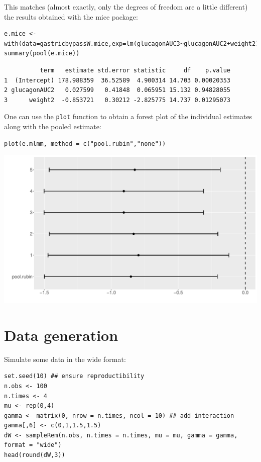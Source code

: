 \documentclass[12pt]{article}
\begin{document}
\clearpage

This matches (almost exactly, only the degrees of freedom are a little
different) the results obtained with the mice package:
\lstset{language=r,label= ,caption= ,captionpos=b,numbers=none}
\begin{lstlisting}
e.mice <- with(data=gastricbypassW.mice,exp=lm(glucagonAUC3~glucagonAUC2+weight2))
summary(pool(e.mice))
\end{lstlisting}

\begin{verbatim}
          term   estimate std.error statistic     df    p.value
1  (Intercept) 178.988359  36.52589  4.900314 14.703 0.00020353
2 glucagonAUC2   0.027599   0.41848  0.065951 15.132 0.94828055
3      weight2  -0.853721   0.30212 -2.825775 14.737 0.01295073
\end{verbatim}


One can use the \texttt{plot} function to obtain a forest plot of the
individual estimates along with the pooled estimate:
\lstset{language=r,label= ,caption= ,captionpos=b,numbers=none}
\begin{lstlisting}
plot(e.mlmm, method = c("pool.rubin","none"))
\end{lstlisting}

\begin{center}
\includegraphics[trim={0 0 0 0},width=1\textwidth]{./figures/forestplot.pdf}
\end{center}

\clearpage

\section{Data generation}
\label{sec:orgb89efd3}
Simulate some data in the wide format:
\lstset{language=r,label= ,caption= ,captionpos=b,numbers=none}
\begin{lstlisting}
set.seed(10) ## ensure reproductibility
n.obs <- 100
n.times <- 4
mu <- rep(0,4)
gamma <- matrix(0, nrow = n.times, ncol = 10) ## add interaction
gamma[,6] <- c(0,1,1.5,1.5)
dW <- sampleRem(n.obs, n.times = n.times, mu = mu, gamma = gamma, format = "wide")
head(round(dW,3))
\end{lstlisting}
\end{document}
